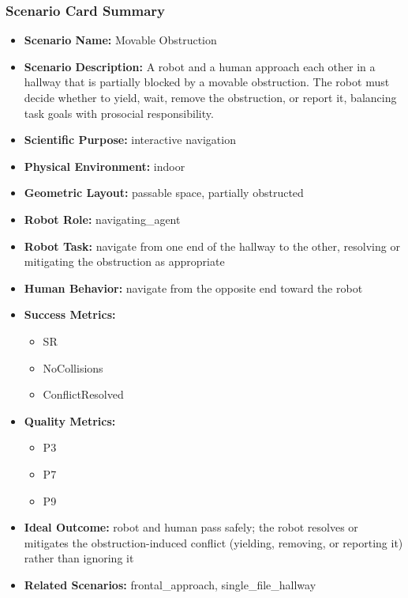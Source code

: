 \documentclass[utf8]{frontiers_suppmat} %
\providecommand{\tightlist}{%
  \setlength{\itemsep}{0pt}\setlength{\parskip}{0pt}}
\begin{document}
\subsubsection{Scenario Card Summary}\label{scenario-card-summary}

\begin{itemize}
\tightlist
\item
  \textbf{Scenario Name:} Movable Obstruction
\item
  \textbf{Scenario Description:} A robot and a human approach each other
  in a hallway that is partially blocked by a movable obstruction. The
  robot must decide whether to yield, wait, remove the obstruction, or
  report it, balancing task goals with prosocial responsibility.
\item
  \textbf{Scientific Purpose:} interactive navigation
\item
  \textbf{Physical Environment:} indoor
\item
  \textbf{Geometric Layout:} passable space, partially obstructed
\item
  \textbf{Robot Role:} navigating\_agent
\item
  \textbf{Robot Task:} navigate from one end of the hallway to the
  other, resolving or mitigating the obstruction as appropriate
\item
  \textbf{Human Behavior:} navigate from the opposite end toward the
  robot
\item
  \textbf{Success Metrics:}

  \begin{itemize}
  \tightlist
  \item
    SR
  \item
    NoCollisions
  \item
    ConflictResolved
  \end{itemize}
\item
  \textbf{Quality Metrics:}

  \begin{itemize}
  \tightlist
  \item
    P3
  \item
    P7
  \item
    P9
  \end{itemize}
\item
  \textbf{Ideal Outcome:} robot and human pass safely; the robot
  resolves or mitigates the obstruction-induced conflict (yielding,
  removing, or reporting it) rather than ignoring it
\item
  \textbf{Related Scenarios:} frontal\_approach, single\_file\_hallway
\end{itemize}
\end{document}
